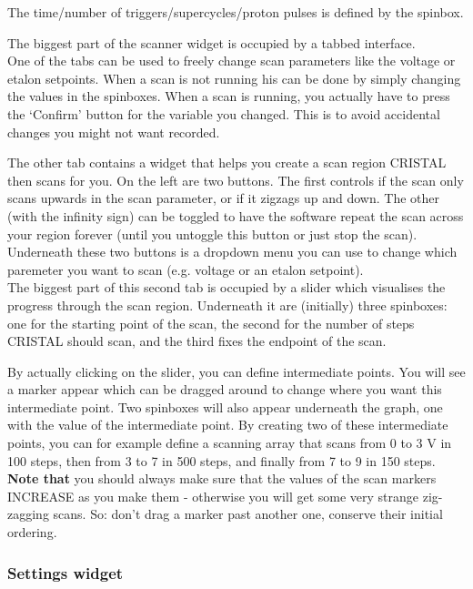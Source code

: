 \documentclass[10pt,a4paper]{article}
\begin{document}
The time/number of triggers/supercycles/proton pulses is defined by the spinbox.

The biggest part of the scanner widget is occupied by a tabbed interface. \\

One of the tabs can be used to freely change scan parameters like the voltage or etalon setpoints. When a scan is not running his can be done by simply changing the values in the spinboxes. When a scan is running, you actually have to press the `Confirm' button for the variable you changed. This is to avoid accidental changes you might not want recorded.

The other tab contains a widget that helps you create a scan region CRISTAL then scans for you. On the left are two buttons. The first controls if the scan only scans upwards in the scan parameter, or if it zigzags up and down. The other (with the infinity sign) can be toggled to have the software repeat the scan across your region forever (until you untoggle this button or just stop the scan). \\

Underneath these two buttons is a dropdown menu you can use to change which paremeter you want to scan (e.g. voltage or an etalon setpoint). \\

The biggest part of this second tab is occupied by a slider which visualises the progress through the scan region. Underneath it are (initially) three spinboxes: one for the starting point of the scan, the second for the number of steps CRISTAL should scan, and the third fixes the endpoint of the scan.\

By actually clicking on the slider, you can define intermediate points. You will see a marker appear which can be dragged around to change where you want this intermediate point. Two spinboxes will also appear underneath the graph, one with the value of the intermediate point. By creating two of these intermediate points, you can for example define a scanning array that scans from 0 to 3 V in 100 steps, then from 3 to 7 in 500 steps, and finally from 7 to 9 in 150 steps.\\
\textbf{Note that} you should always make sure that the values of the scan markers INCREASE as you make them - otherwise you will get some very strange zig-zagging scans. So: don't drag a marker past another one, conserve their initial ordering.


\subsubsection{Settings widget}
\end{document}
